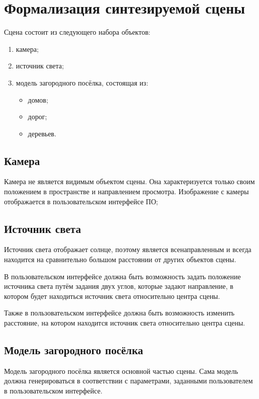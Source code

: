 
\section{Формализация синтезируемой сцены}

Сцена состоит из следующего набора объектов:
\begin{enumerate}
    \item камера;
    \item источник света;
    \item модель загородного посёлка, состоящая из: 
    \begin{itemize}
        \item домов;
        \item дорог;
        \item деревьев.
    \end{itemize}
\end{enumerate}

\subsection{Камера}

Камера не является видимым объектом сцены. Она характеризуется только своим положением в пространстве и направлением просмотра. Изображение с камеры отображается в пользовательском интерфейсе ПО;

\subsection{Источник света}

Источник света отображает солнце, поэтому является всенаправленным и всегда находится на сравнительно большом расстоянии от других объектов сцены.

В пользовательском интерфейсе должна быть возможность задать положение источника света путём задания двух углов, которые задают направление, в котором будет находиться источник света относительно центра сцены. 

Также в пользовательском интерфейсе должна быть возможность изменить расстояние, на котором находится источник света относительно центра сцены.

\subsection{Модель загородного посёлка}

Модель загородного посёлка является основной частью сцены. Сама модель должна генерироваться в соответствии с параметрами, заданными пользователем в пользовательском интерфейсе.


